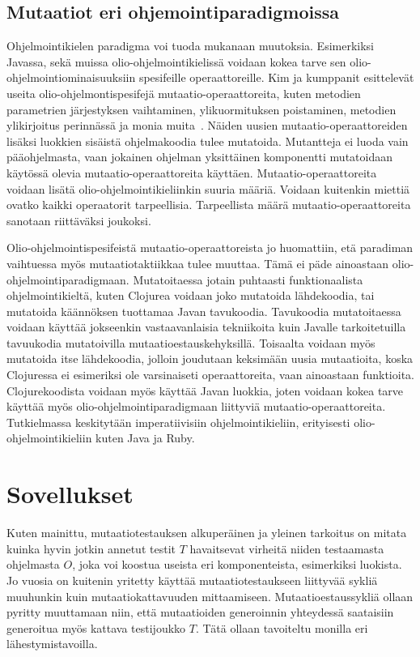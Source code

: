 \documentclass{tktltiki}
\begin{document}
\subsection{Mutaatiot eri ohjemointiparadigmoissa}
Ohjelmointikielen paradigma voi tuoda mukanaan muutoksia. Esimerkiksi Javassa, sekä muissa olio-ohjelmointikielissä voidaan kokea tarve sen olio-ohjelmointiominaisuuksiin spesifeille operaattoreille. Kim ja kumppanit esittelevät useita olio-ohjelmontispesifejä mutaatio-operaattoreita, kuten metodien parametrien järjestyksen vaihtaminen, ylikuormituksen poistaminen, metodien ylikirjoitus perinnässä ja monia muita~\cite{}. Näiden uusien mutaatio-operaattoreiden lisäksi luokkien sisäistä ohjelmakoodia tulee mutatoida. Mutantteja ei luoda vain pääohjelmasta, vaan jokainen ohjelman yksittäinen komponentti mutatoidaan käytössä olevia mutaatio-operaattoreita käyttäen. Mutaatio-operaattoreita voidaan lisätä olio-ohjelmointikieliinkin suuria määriä. Voidaan kuitenkin miettiä ovatko kaikki operaatorit tarpeellisia. Tarpeellista määrä mutaatio-operaattoreita sanotaan riittäväksi joukoksi.

Olio-ohjelmointispesifeistä mutaatio-operaattoreista jo huomattiin, etä paradiman vaihtuessa myös mutaatiotaktiikkaa tulee muuttaa. Tämä ei päde ainoastaan olio-ohjelmointiparadigmaan. Mutatoitaessa jotain puhtaasti funktionaalista ohjelmointikieltä, kuten Clojurea voidaan joko mutatoida lähdekoodia, tai mutatoida käännöksen tuottamaa Javan tavukoodia. Tavukoodia mutatoitaessa voidaan käyttää jokseenkin vastaavanlaisia tekniikoita kuin Javalle tarkoitetuilla tavuukodia mutatoivilla mutaatioestauskehyksillä. Toisaalta voidaan myös mutatoida itse lähdekoodia, jolloin joudutaan keksimään uusia mutaatioita, koska Clojuressa ei esimeriksi ole varsinaiseti operaattoreita, vaan ainoastaan funktioita. Clojurekoodista voidaan myös käyttää Javan luokkia, joten voidaan kokea tarve käyttää myös olio-ohjelmointiparadigmaan liittyviä mutaatio-operaattoreita. Tutkielmassa keskitytään imperatiivisiin ohjelmointikieliin, erityisesti olio-ohjelmointikieliin kuten Java ja Ruby.

\section{Sovellukset}
Kuten mainittu, mutaatiotestauksen alkuperäinen ja yleinen tarkoitus on mitata kuinka hyvin jotkin annetut testit $T$ havaitsevat virheitä niiden testaamasta ohjelmasta $O$, joka voi koostua useista eri komponenteista, esimerkiksi luokista. Jo vuosia on kuitenin yritetty käyttää mutaatiotestaukseen liittyvää sykliä muuhunkin kuin mutaatiokattavuuden mittaamiseen. Mutaatioestaussykliä ollaan pyritty muuttamaan niin, että mutaatioiden generoinnin yhteydessä saataisiin generoitua myös kattava testijoukko $T$. Tätä ollaan tavoiteltu monilla eri lähestymistavoilla. 
\end{document}
